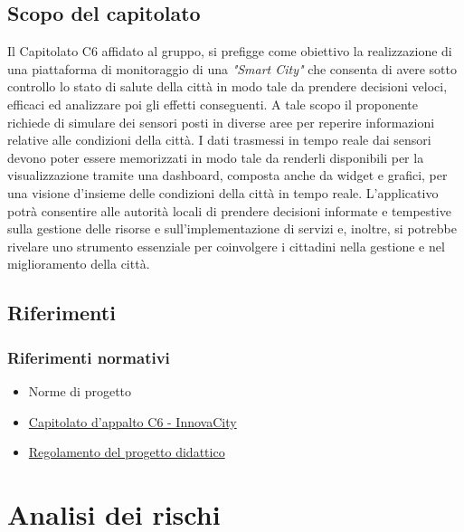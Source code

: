 \documentclass{article}
\begin{document}
\subsection{Scopo del capitolato}
Il Capitolato C6 affidato al gruppo, si prefigge come obiettivo la realizzazione di una piattaforma di monitoraggio di una \textit{"Smart City"} che consenta di avere sotto controllo lo stato di salute della città in modo tale da prendere decisioni veloci, efficaci ed analizzare poi gli effetti conseguenti.
A tale scopo il proponente richiede di simulare dei sensori posti in diverse aree per reperire informazioni relative alle condizioni della città. 
I dati trasmessi in tempo reale dai sensori devono poter essere memorizzati in modo tale da renderli disponibili per la visualizzazione tramite una dashboard, composta anche da widget e grafici, per una visione d'insieme delle condizioni della città in tempo reale. 
L'applicativo potrà consentire alle autorità locali di prendere decisioni informate e tempestive sulla gestione delle risorse e sull'implementazione di servizi e, inoltre, si potrebbe rivelare uno strumento essenziale per coinvolgere i cittadini nella gestione e nel miglioramento della città.

\subsection{Riferimenti}
\subsubsection{Riferimenti normativi}
\begin{itemize}
\item Norme di progetto
\item \href {https://www.math.unipd.it/~tullio/IS-1/2023/Progetto/C6.pdf} {Capitolato d'appalto C6 - InnovaCity}
\item \href {https://www.math.unipd.it/~tullio/IS-1/2023/Dispense/PD2.pdf} {Regolamento del progetto didattico}
\end{itemize}


\section{Analisi dei rischi}
\end{document}
